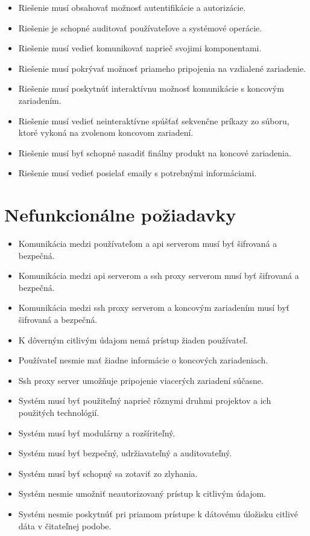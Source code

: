 \begin{itemize}
    \item Riešenie musí obsahovať možnosť autentifikácie a autorizácie.
    \item Riešenie je schopné auditovať používateľove a systémové operácie.
    \item Riešenie musí vedieť komunikovať naprieč svojimi komponentami.
    \item Riešenie musí pokrývať možnosť priameho pripojenia na vzdialené zariadenie.
    \item Riešenie musí poskytnúť interaktívnu možnosť komunikácie s koncovým zariadením.
    \item Riešenie musí vedieť neinteraktívne spúšťať sekvenčne príkazy zo súboru, ktoré vykoná na zvolenom koncovom zariadení.
    \item Riešenie musí byť schopné nasadiť finálny produkt na koncové zariadenia.
    \item Riešenie musí vedieť posielať emaily s potrebnými informáciami.
\end{itemize}

\section{Nefunkcionálne požiadavky}\label{sec:nefunkcionalne-poziadavky}

\begin{itemize}
    \item Komunikácia medzi používateľom a api serverom musí byť šifrovaná a bezpečná.
    \item Komunikácia medzi api serverom a ssh proxy serverom musí byť šifrovaná a bezpečná.
    \item Komunikácia medzi ssh proxy serverom a koncovým zariadením musí byť šifrovaná a bezpečná.
    \item K dôverným citlivým údajom nemá prístup žiaden používateľ.
    \item Používateľ nesmie mať žiadne informácie o koncových zariadeniach.
    \item Ssh proxy server umožňuje pripojenie viacerých zariadení súčasne.
    \item Systém musí byť použiteľný naprieč rôznymi druhmi projektov a ich použitých technológií.
    \item Systém musí byť modulárny a rozšíriteľný.
    \item Systém musí byť bezpečný, udržiavateľný a auditovateľný.
    \item Systém musí byť schopný sa zotaviť zo zlyhania.
    \item Systém nesmie umožniť neautorizovaný prístup k citlivým údajom.
    \item Systém nesmie poskytnúť pri priamom prístupe k dátovému úložisku citlivé dáta v čitateľnej podobe.
\end{itemize}
